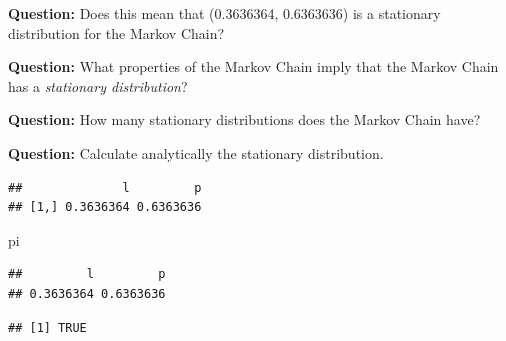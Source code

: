 \documentclass[]{article}
\newenvironment{Shaded}{\begin{snugshade}}{\end{snugshade}}
\newcommand{\CommentTok}[1]{\textcolor[rgb]{0.56,0.35,0.01}{\textit{#1}}}
\newcommand{\DecValTok}[1]{\textcolor[rgb]{0.00,0.00,0.81}{#1}}
\newcommand{\KeywordTok}[1]{\textcolor[rgb]{0.13,0.29,0.53}{\textbf{#1}}}
\newcommand{\NormalTok}[1]{#1}
\newcommand{\OperatorTok}[1]{\textcolor[rgb]{0.81,0.36,0.00}{\textbf{#1}}}
\newcommand{\StringTok}[1]{\textcolor[rgb]{0.31,0.60,0.02}{#1}}
\begin{document}
\textbf{Question:} Does this mean that (0.3636364, 0.6363636) is a
stationary distribution for the Markov Chain?

\textbf{Question:} What properties of the Markov Chain imply that the
Markov Chain has a \emph{stationary distribution}?

\textbf{Question:} How many stationary distributions does the Markov
Chain have?

\textbf{Question:} Calculate analytically the stationary distribution.

\begin{Shaded}
\end{Shaded}

\begin{verbatim}
##              l         p
## [1,] 0.3636364 0.6363636
\end{verbatim}

\begin{Shaded}
\begin{Highlighting}[]
\NormalTok{pi}
\end{Highlighting}
\end{Shaded}

\begin{verbatim}
##         l         p 
## 0.3636364 0.6363636
\end{verbatim}

\begin{Shaded}
\end{Shaded}

\begin{verbatim}
## [1] TRUE
\end{verbatim}
\end{document}
